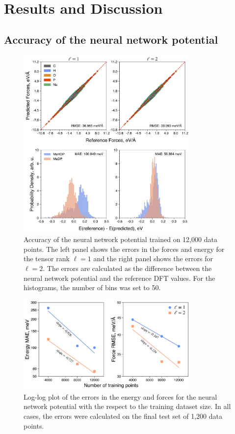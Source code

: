 \chapter{Results and Discussion}

\section{Accuracy of the neural network potential}

\begin{figure}[htbp]
    \centering
    \includegraphics[width=0.8\textwidth]{Figures/4_Results/results_nnp_accuracy_l-1_l-2.png}
    \caption{Accuracy of the neural network potential trained on 12,000 data points. The left panel shows the errors in the forces and energy for the tensor rank $\ell=1$ and the right panel shows the errors for $\ell=2$. The errors are calculated as the difference between the neural network potential and the reference DFT values. For the histograms, the number of bins was set to 50.}
    \label{fig:nnp_accuracy}
\end{figure}

\begin{figure}[htbp]
    \centering
    \includegraphics[width=0.8\textwidth]{Figures/4_Results/results_nnp_loglog_energy_force.png}
    \caption{Log-log plot of the errors in the energy and forces for the neural network potential with the respect to the training dataset size. In all cases, the errors were calculated on the final test set of 1,200 data points.}
    \label{fig:nnp_log-log}
\end{figure}
